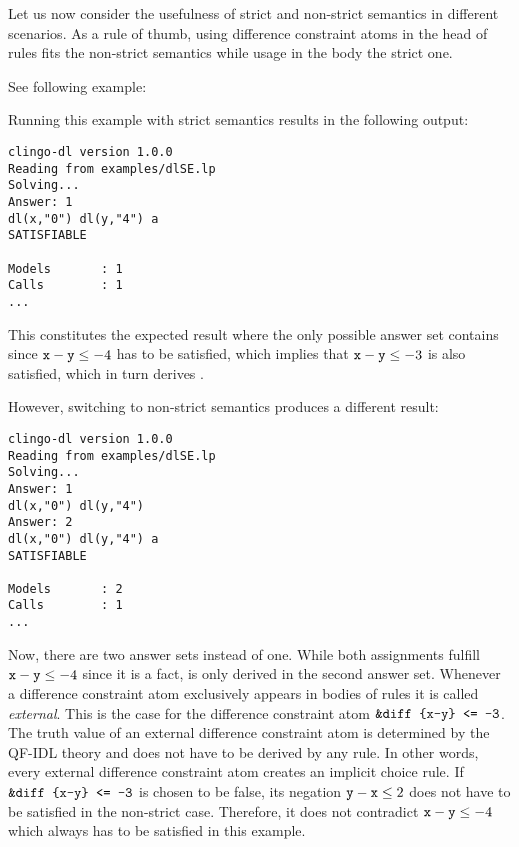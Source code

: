 Let us now consider the usefulness of strict and non-strict semantics in different scenarios.
As a rule of thumb, using difference constraint atoms in the head of rules fits the non-strict semantics 
while usage in the body the strict one.

\begin{example}\label{ex:dl:se}
See following example:

Running this example with strict semantics results in the following output:

\begin{lstlisting}[numbers=none]
clingo-dl version 1.0.0
Reading from examples/dlSE.lp
Solving...
Answer: 1
dl(x,"0") dl(y,"4") a
SATISFIABLE

Models       : 1
Calls        : 1
...
\end{lstlisting}

This constitutes the expected result 
where the only possible answer set contains  since $\texttt{x}-\texttt{y}\leq-4$
has to be satisfied, which implies that $\texttt{x}-\texttt{y}\leq-3$ is also satisfied,
which in turn derives .

However, switching to non-strict semantics produces a different result:

\begin{lstlisting}[numbers=none]
clingo-dl version 1.0.0
Reading from examples/dlSE.lp
Solving...
Answer: 1
dl(x,"0") dl(y,"4")
Answer: 2
dl(x,"0") dl(y,"4") a
SATISFIABLE

Models       : 2
Calls        : 1
...
\end{lstlisting}

Now, there are two answer sets instead of one. 
While both assignments fulfill $\texttt{x}-\texttt{y}\leq-4$ since it is a fact,
 is only derived in the second answer set.
Whenever a difference constraint atom exclusively appears in bodies of rules it is called \emph{external}.
This is the case for the difference constraint atom $\texttt{\&diff\text{ }\{x-y\}\text{ }<=\text{ }-3}$.
The truth value of an external difference constraint atom is determined by the QF-IDL theory and does not have to be derived by any rule.
In other words, every external difference constraint atom creates an implicit choice rule.
If $\texttt{\&diff\text{ }\{x-y\}\text{ }<=\text{ }-3}$ is chosen to be false, 
its negation $\texttt{y}-\texttt{x}\leq 2$ does not have to be satisfied in the non-strict case.
Therefore, it does not contradict $\texttt{x}-\texttt{y}\leq -4$ which always has to be satisfied in this example.

\end{example}

